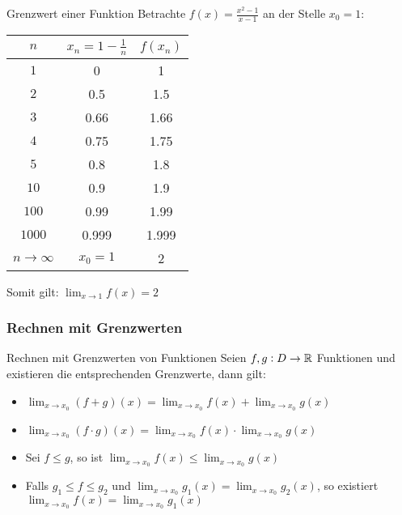 \begin{example2}{Grenzwert einer Funktion}
    Betrachte $f(x)=\frac{x^2-1}{x-1}$ an der Stelle $x_0=1$:

    \begin{center}
        \begin{tabular}{|c|c|c|}
            \hline
            $n$ & $x_n=1-\frac{1}{n}$ & $f(x_n)$ \\
            \hline
            $1$ & 0 & 1 \\
            \hline
            $2$ & 0.5 & 1.5 \\
            \hline
            $3$ & 0.66 & 1.66 \\
            \hline
            $4$ & 0.75 & 1.75 \\
            \hline
            $5$ & 0.8 & 1.8 \\
            \hline
            $10$ & 0.9 & 1.9 \\
            \hline
            $100$ & 0.99 & 1.99 \\
            \hline
            $1000$ & 0.999 & 1.999 \\
            \hline
            $n \rightarrow \infty$ & $x_0=1$ & 2 \\
            \hline
        \end{tabular}
    \end{center}

    Somit gilt: $\lim_{x \rightarrow 1} f(x)=2$
\end{example2}

\subsubsection{Rechnen mit Grenzwerten}

\begin{corollary}{Rechnen mit Grenzwerten von Funktionen}
    Seien $f, g: D \to \mathbb{R}$ Funktionen und existieren die entsprechenden Grenzwerte, dann gilt:
    \begin{itemize}
        \item $\lim_{x \to x_0} (f + g)(x) = \lim_{x \to x_0} f(x) + \lim_{x \to x_0} g(x)$
        \item $\lim_{x \to x_0} (f \cdot g)(x) = \lim_{x \to x_0} f(x) \cdot \lim_{x \to x_0} g(x)$
        \item Sei $f \leq g$, so ist $\lim_{x \to x_0} f(x) \leq \lim_{x \to x_0} g(x)$
        \item Falls $g_1 \leq f \leq g_2$ und $\lim_{x \to x_0} g_1(x) = \lim_{x \to x_0} g_2(x)$, so existiert $\lim_{x \to x_0} f(x) = \lim_{x \to x_0} g_1(x)$
    \end{itemize}
\end{corollary}

